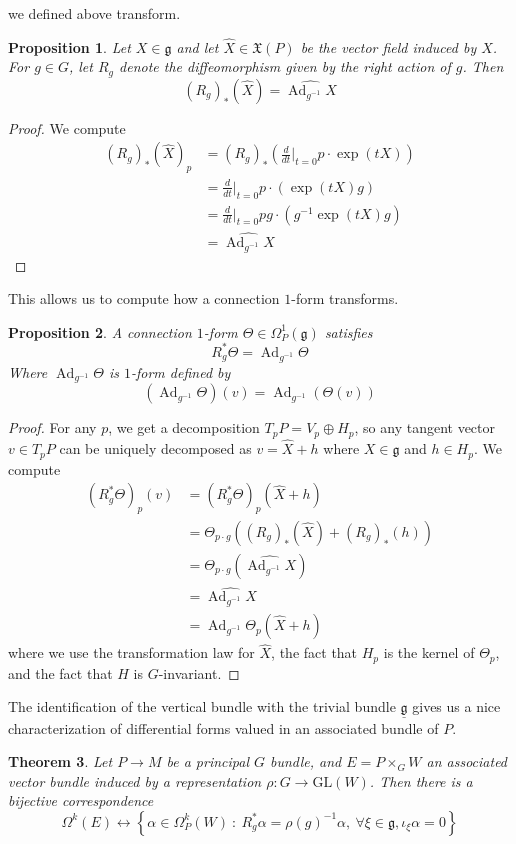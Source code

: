 \documentclass[psamsfonts, 12pt]{amsart}
\newtheorem{thm}{Theorem}[section]
\newtheorem{prop}[thm]{Proposition}
\theoremstyle{definition}
\theoremstyle{remark}
\newcommand{\GL}{\mathrm{GL}}
\newcommand{\g}{\mathfrak{g}}
\newcommand{\inv}{^{-1}}
\newcommand{\set}[1]{\left\lbrace #1 \right\rbrace}
\DeclareMathOperator{\Ad}{Ad}
\begin{document}
we defined above transform.
%
\begin{prop}
Let $X \in \g$ and let $\widehat{X} \in \mathfrak{X}(P)$ be the vector field
induced by $X$. For $g \in G$, let $R_g$ denote the diffeomorphism given by
the right action of $g$. Then
\[
(R_g)_*(\widehat{X}) = \widehat{\Ad_{g\inv}X}
\]
\end{prop}
%
\begin{proof}
We compute
\begin{align*}
(R_g)_*(\widehat{X})_p
&= (R_g)_* \left( \frac{d}{dt}\bigg\vert_{t=0}p\cdot\exp(tX) \right) \\
&= \frac{d}{dt}\bigg\vert_{t=0}p\cdot(\exp(tX)g) \\
&= \frac{d}{dt}\bigg\vert_{t=0}pg\cdot(g\inv\exp(tX)g) \\[5pt]
&= \widehat{\Ad_{g\inv} X}
\end{align*}
\end{proof}
%
This allows us to compute how a connection $1$-form transforms.
%
\begin{prop}
A connection $1$-form $\Theta \in \Omega^1_P(\g)$ satisfies
\[
R_g^*\Theta = \Ad_{g\inv}\Theta
\]
Where $\Ad_{g\inv}\Theta$ is $1$-form defined by
\[
(\Ad_{g\inv}\Theta)(v) = \Ad_{g\inv}(\Theta(v))
\]
\end{prop}
%
\begin{proof}
For any $p$, we get a decomposition $T_pP = V_p \oplus H_p$, so any tangent vector
$v \in T_pP$ can be uniquely decomposed as $v = \widehat{X} + h$ where $X \in \g$
and $h \in H_p$. We compute
\begin{align*}
(R_g^*\Theta)_p(v) &= (R_g^*\Theta)_p(\widehat{X} + h) \\
&= \Theta_{p \cdot g}((R_g)_*(\widehat{X}) + (R_g)_*(h)) \\
&= \Theta_{p\cdot g}(\widehat{\Ad_{g\inv}X}) \\
&= \widehat{\Ad_{g\inv} X} \\
&= \Ad_{g\inv}\Theta_p(\widehat{X} + h)
\end{align*}
where we use the transformation law for $\widehat{X}$, the fact that $H_p$ is
the kernel of $\Theta_p$, and the fact that $H$ is $G$-invariant.
\end{proof}
%
%
The identification of the vertical bundle with the trivial bundle $\underline{\g}$ gives
us a nice characterization of differential forms valued in an associated bundle of
$P$.
%
\begin{thm}
Let $P \to M$ be a principal $G$ bundle, and $E = P\times_G W$ an associated vector bundle
induced by a representation $\rho : G \to \GL(W)$. Then there is a bijective correspondence
\[
\Omega^k(E) \leftrightarrow\set{\alpha \in \Omega^k_P(W) ~:~
R_g^*\alpha = \rho(g)\inv\alpha, ~\forall\xi\in\g, \iota_\xi\alpha = 0}
\]
\end{thm}
\end{document}
